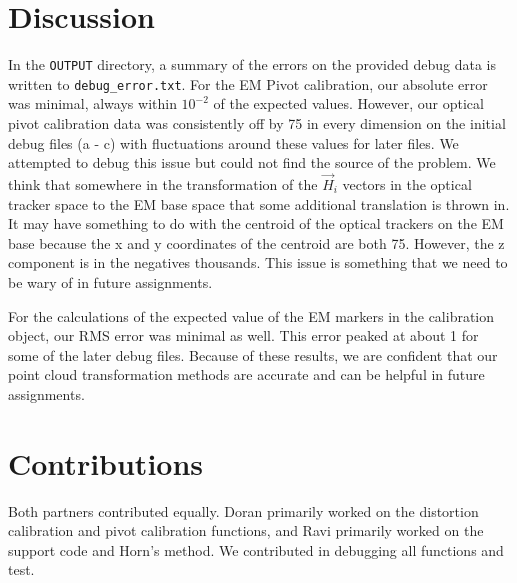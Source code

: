 \documentclass[letterpaper, 11pt]{report}
\begin{document}
\section{Discussion}
In the \texttt{OUTPUT} directory, a summary of the errors on the provided debug data is written to \texttt{debug\_error.txt}. For the EM Pivot calibration, our absolute error was minimal, always within $10^{-2}$ of the expected values. However, our optical pivot calibration data was consistently off by 75 in every dimension on the initial debug files (a - c) with fluctuations around these values for later files. We attempted to debug this issue but could not find the source of the problem.  We think that somewhere in the transformation of the $\vec H_i$ vectors in the optical tracker space to the EM base space that some additional translation is thrown in. It may have something to do with the centroid of the optical trackers on the EM base because the x and y coordinates of the centroid are both 75. However, the z component is in the negatives thousands. This issue is something that we need to be wary of in future assignments.

For the calculations of the expected value of the EM markers in the calibration object, our RMS error was minimal as well. This error peaked at about 1 for some of the later debug files. Because of these results, we are confident that our point cloud transformation methods are accurate and can be helpful in future assignments.


\section{Contributions}
Both partners contributed equally. Doran primarily worked on the distortion calibration and pivot calibration functions, and Ravi primarily worked on the support code and Horn's method. We contributed in debugging all functions and test.
\end{document}
